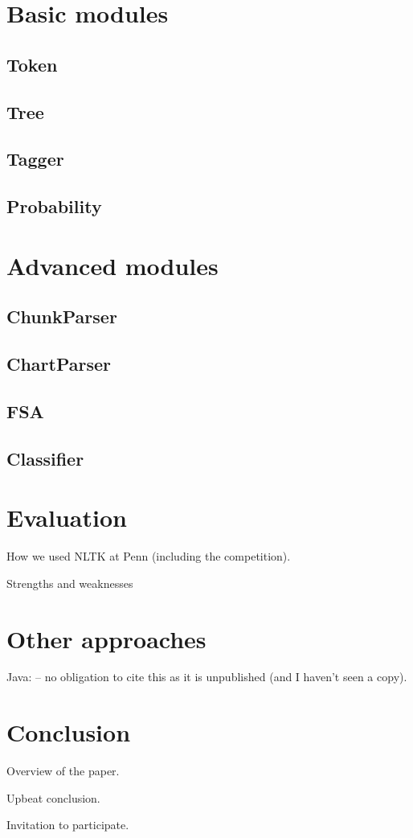 \documentclass[11pt]{article}
\begin{document}
\section{Basic modules}

\subsection{Token}

\subsection{Tree}

\subsection{Tagger}

\subsection{Probability}

\section{Advanced modules}

\subsection{ChunkParser}

\subsection{ChartParser}

\subsection{FSA}

\subsection{Classifier}


\section{Evaluation}

How we used NLTK at Penn (including the competition).

Strengths and weaknesses

\section{Other approaches}

Java: \cite{Hammond02}
-- no obligation to cite this as it is unpublished
(and I haven't seen a copy).

\section{Conclusion}

Overview of the paper.

Upbeat conclusion.

Invitation to participate.



\end{document}
